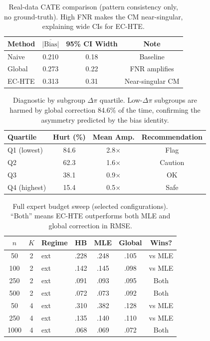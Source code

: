 \documentclass[11pt,twocolumn]{article}
\begin{document}
\begin{table}[t]
\centering
\caption{Real-data CATE comparison (pattern consistency only, no ground-truth). High FNR makes the CM near-singular, explaining wide CIs for EC-HTE.}
\label{tab:real_cate}
\small
\begin{tabular}{@{}lccc@{}}
\toprule
Method & $\overline{|\text{Bias}|}$ & 95\% CI Width & Note \\
\midrule
Naive & 0.210 & 0.18 & Baseline \\
Global & 0.273 & 0.22 & FNR amplifies \\
EC-HTE & 0.313 & 0.31 & Near-singular CM \\
\bottomrule
\end{tabular}
\end{table}

\begin{table}[t]
\centering
\caption{Diagnostic by subgroup $\Delta\pi$ quartile. Low-$\Delta\pi$ subgroups are harmed by global correction 84.6\% of the time, confirming the asymmetry predicted by the bias identity.}
\label{tab:diag_quartile}
\small
\begin{tabular}{@{}lccc@{}}
\toprule
Quartile & Hurt (\%) & Mean Amp. & Recommendation \\
\midrule
Q1 (lowest) & 84.6 & 2.8$\times$ & Flag \\
Q2 & 62.3 & 1.6$\times$ & Caution \\
Q3 & 38.1 & 0.9$\times$ & OK \\
Q4 (highest) & 15.4 & 0.5$\times$ & Safe \\
\bottomrule
\end{tabular}
\end{table}

\begin{table}[t]
\centering
\caption{Full expert budget sweep (selected configurations). ``Both'' means EC-HTE outperforms both MLE and global correction in RMSE.}
\label{tab:budget_full}
\small
\begin{tabular}{@{}cclcccc@{}}
\toprule
$n$ & $K$ & Regime & HB & MLE & Global & Wins? \\
\midrule
50 & 2 & ext & .228 & .248 & .105 & vs MLE \\
100 & 2 & ext & .142 & .145 & .098 & vs MLE \\
250 & 2 & ext & .091 & .093 & .095 & Both \\
500 & 2 & ext & .072 & .073 & .092 & Both \\
50 & 4 & ext & .310 & .382 & .128 & vs MLE \\
250 & 4 & ext & .135 & .140 & .110 & vs MLE \\
1000 & 4 & ext & .068 & .069 & .072 & Both \\
\bottomrule
\end{tabular}
\end{table}
\end{document}
